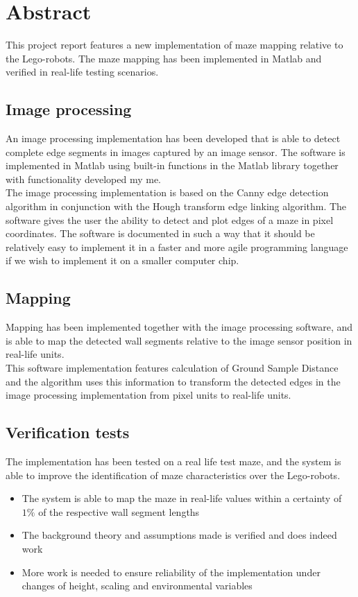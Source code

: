 \section*{Abstract}
This project report features a new implementation of maze mapping relative to the Lego-robots. The maze mapping has been implemented in Matlab and verified in real-life testing scenarios. 
\subsection*{Image processing}
An image processing implementation has been developed that is able to detect complete edge segments in images captured by an image sensor. The software is implemented in Matlab using built-in functions in the Matlab library together with functionality developed my me.\\

The image processing implementation is based on the Canny edge detection algorithm in conjunction with the Hough transform edge linking algorithm. The software gives the user the ability to detect and plot edges of a maze in pixel coordinates. The software is documented in such a way that it should be relatively easy to implement it in a faster and more agile programming language if we wish to implement it on a smaller computer chip. 

\subsection*{Mapping}
Mapping has been implemented together with the image processing software, and is able to map the detected wall segments relative to the image sensor position in real-life units. \\

This software implementation features calculation of Ground Sample Distance and the algorithm uses this information to transform the detected edges in the image processing implementation from pixel units to real-life units.

\subsection*{Verification tests}
The implementation has been tested on a real life test maze, and the system is able to improve the identification of maze characteristics over the Lego-robots.
\begin{itemize}
\item The system is able to map the maze in real-life values within a certainty of $1\%$ of the respective wall segment lengths
\item The background theory and assumptions made is verified and does indeed work
\item More work is needed to ensure reliability of the implementation under changes of height, scaling and environmental variables
\end{itemize}













